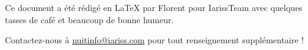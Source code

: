 \documentclass[12pt, a4paper]{article}
\newcommand{\espace}{\vspace{.8cm}}
\newcommand{\authors}{Florent}
\begin{document}

\espace\vfill{}
Ce document a été rédigé en \LaTeX{} par \authors{} pour IarissTeam avec quelques tasses de café et beaucoup de bonne humeur.

Contactez-nous à \href{mailto:nuitinfo@iariss.com}{nuitinfo@iariss.com} pour tout renseignement supplémentaire !
\end{document}
